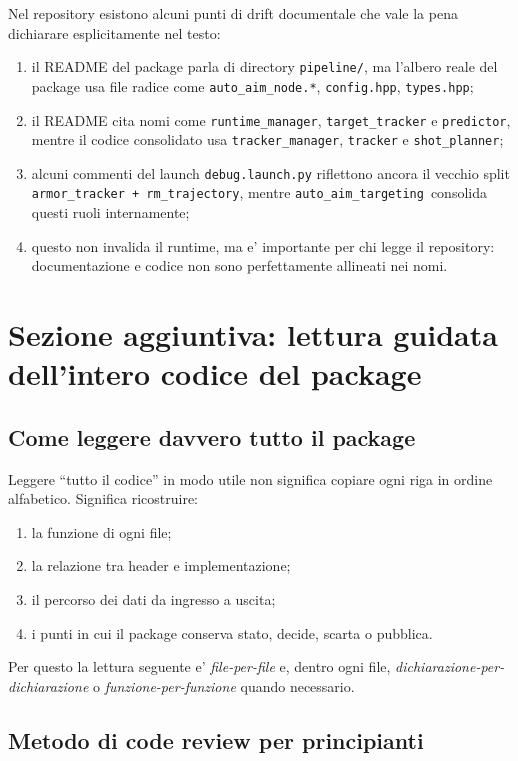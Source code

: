 \documentclass[11pt,a4paper]{article}
\newcommand{\pkg}{\texttt{auto\_aim\_targeting}}
\newcommand{\code}[1]{\texttt{#1}}
\begin{document}
Nel repository esistono alcuni punti di drift documentale che vale la pena dichiarare esplicitamente nel testo:
\begin{enumerate}[leftmargin=1.4em]
  \item il README del package parla di directory \code{pipeline/}, ma l'albero reale del package usa file radice come \code{auto\_aim\_node.*}, \code{config.hpp}, \code{types.hpp};
  \item il README cita nomi come \code{runtime\_manager}, \code{target\_tracker} e \code{predictor}, mentre il codice consolidato usa \code{tracker\_manager}, \code{tracker} e \code{shot\_planner};
  \item alcuni commenti del launch \code{debug.launch.py} riflettono ancora il vecchio split \code{armor\_tracker + rm\_trajectory}, mentre \pkg\ consolida questi ruoli internamente;
  \item questo non invalida il runtime, ma e' importante per chi legge il repository: documentazione e codice non sono perfettamente allineati nei nomi.
\end{enumerate}

\section{Sezione aggiuntiva: lettura guidata dell'intero codice del package}

\subsection{Come leggere davvero tutto il package}

Leggere ``tutto il codice'' in modo utile non significa copiare ogni riga in ordine alfabetico. Significa ricostruire:
\begin{enumerate}[leftmargin=1.4em]
  \item la funzione di ogni file;
  \item la relazione tra header e implementazione;
  \item il percorso dei dati da ingresso a uscita;
  \item i punti in cui il package conserva stato, decide, scarta o pubblica.
\end{enumerate}

Per questo la lettura seguente e' \emph{file-per-file} e, dentro ogni file, \emph{dichiarazione-per-dichiarazione} o \emph{funzione-per-funzione} quando necessario.

\subsection{Metodo di code review per principianti}
\end{document}
